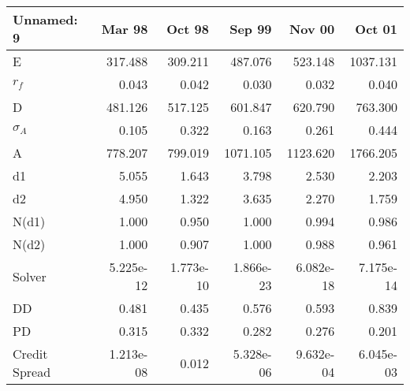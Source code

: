 \begin{tabular}{lrrrrr}
\toprule
    Unnamed: 9 &    Mar 98 &    Oct 98 &    Sep 99 &    Nov 00 &    Oct 01 \\
\midrule
             E &   317.488 &   309.211 &   487.076 &   523.148 &  1037.131 \\
         $r_f$ &     0.043 &     0.042 &     0.030 &     0.032 &     0.040 \\
             D &   481.126 &   517.125 &   601.847 &   620.790 &   763.300 \\
    $\sigma_A$ &     0.105 &     0.322 &     0.163 &     0.261 &     0.444 \\
             A &   778.207 &   799.019 &  1071.105 &  1123.620 &  1766.205 \\
            d1 &     5.055 &     1.643 &     3.798 &     2.530 &     2.203 \\
            d2 &     4.950 &     1.322 &     3.635 &     2.270 &     1.759 \\
         N(d1) &     1.000 &     0.950 &     1.000 &     0.994 &     0.986 \\
         N(d2) &     1.000 &     0.907 &     1.000 &     0.988 &     0.961 \\
        Solver & 5.225e-12 & 1.773e-10 & 1.866e-23 & 6.082e-18 & 7.175e-14 \\
            DD &     0.481 &     0.435 &     0.576 &     0.593 &     0.839 \\
            PD &     0.315 &     0.332 &     0.282 &     0.276 &     0.201 \\
 Credit Spread & 1.213e-08 &     0.012 & 5.328e-06 & 9.632e-04 & 6.045e-03 \\
\bottomrule
\end{tabular}
